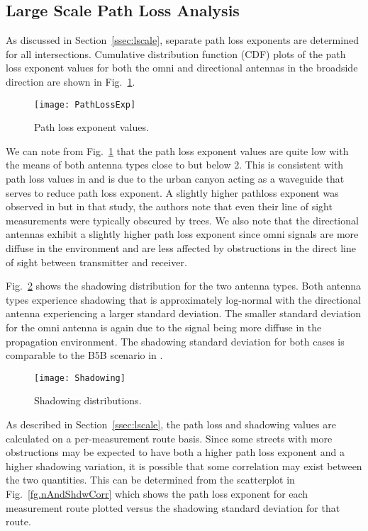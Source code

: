 \documentclass[12pt]{IEEEtran}
\begin{document}
\subsection{Large Scale Path Loss Analysis}
\label{ssec:lsanalysis}

As discussed in Section~\ref{ssec:lscale}, separate path loss exponents are determined for all intersections.  Cumulative distribution function (CDF) plots of the path loss exponent values for both the omni and directional antennas in the broadside direction are shown in Fig.~\ref{fg.pathloss}.  


\begin{figure}[htbp]
\centerline{\texttt{[image: PathLossExp]}}
\caption{Path loss exponent values.}
\label{fg.pathloss}
\end{figure}

We can note from Fig.~\ref{fg.pathloss} that the path loss exponent values are quite low with the means of both antenna types close to but below 2.  This is consistent with path loss values in \cite{xia-h-1994, xia-h-1993, feuerstein-mj-1994, winner-2005} and is due to the urban canyon acting as a waveguide that serves to reduce path loss exponent.   A slightly higher pathloss exponent was observed in \cite{ahumada-l-2013} but in that study, the authors note that even their line of sight measurements were typically obscured by trees.  We also note that the directional antennas exhibit a slightly higher path loss exponent since omni signals are more diffuse in the environment and are less affected by obstructions in the direct line of sight between transmitter and receiver.

Fig.~\ref{fg.shadow} shows the shadowing distribution for the two antenna types.  Both antenna types experience shadowing that is approximately log-normal with the directional antenna experiencing a larger standard deviation.   The smaller standard deviation for the omni antenna is again due to the signal being more diffuse in the propagation environment.  The shadowing standard deviation for both cases is comparable to the B5B scenario in \cite{winner-2005}.

\begin{figure}[htbp]
\centerline{\texttt{[image: Shadowing]}}
\caption{Shadowing distributions.}
\label{fg.shadow}
\end{figure}

As described in Section~\ref{ssec:lscale}, the path loss and shadowing values are calculated on a per-measurement route basis.  Since some streets with more obstructions may be expected to have both a higher path loss exponent and a higher shadowing variation, it is possible that some correlation may exist between the two quantities.  This can be determined from the scatterplot in Fig.~\ref{fg.nAndShdwCorr} which shows the path loss exponent for each measurement route plotted versus the shadowing standard deviation for that route.
\end{document}
